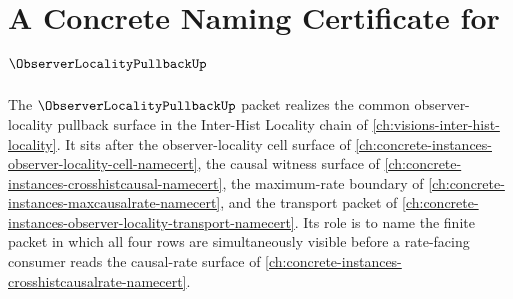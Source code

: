 \chapter{A Concrete Naming Certificate for $\ObserverLocalityPullbackUp$}
\label{ch:concrete-instances-observer-locality-pullback-namecert}

The $\ObserverLocalityPullbackUp$ packet realizes the common observer-locality pullback surface in the Inter-Hist Locality chain of \autoref{ch:visions-inter-hist-locality}. It sits after the observer-locality cell surface of \autoref{ch:concrete-instances-observer-locality-cell-namecert}, the causal witness surface of \autoref{ch:concrete-instances-crosshistcausal-namecert}, the maximum-rate boundary of \autoref{ch:concrete-instances-maxcausalrate-namecert}, and the transport packet of \autoref{ch:concrete-instances-observer-locality-transport-namecert}. Its role is to name the finite packet in which all four rows are simultaneously visible before a rate-facing consumer reads the causal-rate surface of \autoref{ch:concrete-instances-crosshistcausalrate-namecert}.


